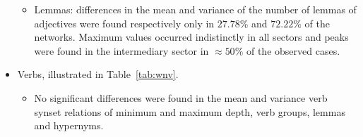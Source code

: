 \begin{itemize}
\begin{itemize}
																																																																																																																																																																																																																																									\item Lemmas:
																																																																																																																																																																																																																																													differences in the mean and variance of the number of lemmas of adjectives were found respectively only in $27.78\%$ and $72.22\%$ of the networks.
																																																																																																																																																																																																																																																	Maximum values occurred indistinctly in all sectors and peaks were found in the intermediary sector in $\approx 50\%$ of the observed cases.
																																																																																																																																																																																																																																																	
																																																																																																																																																																																																																																																	\FloatBarrier
																																																																																																																																																																																																																																																			\end{itemize}
																																																																																																																																																																																																																																																				\item Verbs, illustrated in Table~\ref{tab:wnv}.
																																																																																																																																																																																																																																																						\begin{itemize}
																																																																																																																																																																																																																																																									\item No significant differences were found in the mean and variance verb synset relations of minimum and maximum depth, verb groups, lemmas and hypernyms.

\end{itemize}
\end{itemize}

